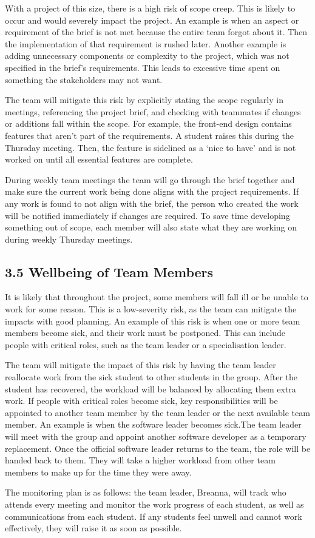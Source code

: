 With a project of this size, there is a high risk of scope creep. This is likely to occur and would severely impact the project. An example is when an aspect or requirement of the brief is not met because the entire team forgot about it. Then the implementation of that requirement is rushed later. Another example is adding unnecessary components or complexity to the project, which was not specified in the brief's requirements. This leads to excessive time spent on something the stakeholders may not want.

The team will mitigate this risk by explicitly stating the scope regularly in meetings, referencing the project brief, and checking with teammates if changes or additions fall within the scope. For example, the front-end design contains features that aren’t part of the requirements. A student raises this during the Thursday meeting. Then, the feature is sidelined as a ‘nice to have’ and is not worked on until all essential features are complete. 

During weekly team meetings the team will go through the brief together and make sure the current work being done aligns with the project requirements. If any work is found to not align with the brief, the person who created the work will be notified immediately if changes are required. To save time developing something out of scope, each member will also state what they are working on during weekly Thursday meetings.

\subsection*{3.5 Wellbeing of Team Members}

It is likely that throughout the project, some members will fall ill or be unable to work for some reason. This is a low-severity risk, as the team can mitigate the impacts with good planning. An example of this risk is when one or more team members become sick, and their work must be postponed. This can include people with critical roles, such as the team leader or a specialisation leader.

The team will mitigate the impact of this risk by having the team leader reallocate work from the sick student to other students in the group. After the student has recovered, the workload will be balanced by allocating them extra work. If people with critical roles become sick, key responsibilities will be appointed to another team member by the team leader or the next available team member. An example is when the software leader becomes sick.The team leader will meet with the group and appoint another software developer as a temporary replacement. Once the official software leader returns to the team, the role will be handed back to them. They will take a higher workload from other team members to make up for the time they were away.

The monitoring plan is as follows: the team leader, Breanna, will track who attends every meeting and monitor the work progress of each student, as well as communications from each student. If any students feel unwell and cannot work effectively, they will raise it as soon as possible.

